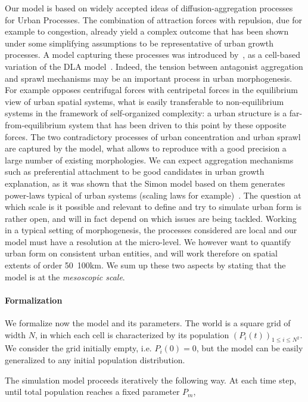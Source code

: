 \documentclass[10pt,letterpaper,draft]{article}
\begin{document}
Our model is based on widely accepted ideas of diffusion-aggregation processes for Urban Processes. The combination of attraction forces with repulsion, due for example to congestion, already yield a complex outcome that has been shown under some simplifying assumptions to be representative of urban growth processes. A model capturing these processes was introduced by~\cite{batty2006hierarchy}, as a cell-based variation of the DLA model~\cite{batty1991generating}. Indeed, the tension between antagonist aggregation and sprawl mechanisms may be an important process in urban morphogenesis. For example \cite{fujita1996economics} opposes centrifugal forces with centripetal forces in the equilibrium view of urban spatial systems, what is easily transferable to non-equilibrium systems in the framework of self-organized complexity: a urban structure is a far-from-equilibrium system that has been driven to this point by these opposite forces. The two contradictory processes of urban concentration and urban sprawl are captured by the model, what allows to reproduce with a good precision a large number of existing morphologies. We can expect aggregation mechanisms such as preferential attachment to be good candidates in urban growth explanation, as it was shown that the Simon model based on them generates power-laws typical of urban systems (scaling laws for example)~\cite{2016arXiv160806313S}. The question at which scale is it possible and relevant to define and try to simulate urban form is rather open, and will in fact depend on which issues are being tackled. Working in a typical setting of morphogenesis, the processes considered are local and our model must have a resolution at the micro-level. We however want to quantify urban form on consistent urban entities, and will work therefore on spatial extents of order 50~100km. We sum up these two aspects by stating that the model is at the \emph{mesoscopic scale}.


\paragraph*{Formalization}

We formalize now the model and its parameters. The world is a square grid of width $N$, in which each cell is characterized by its population $(P_i(t))_{1\leq i\leq N^2}$. We consider the grid initially empty, i.e. $P_i(0)=0$, but the model can be easily generalized to any initial population distribution.

The simulation model proceeds iteratively the following way.
At each time step, until total population reaches a fixed parameter $P_m$,
\end{document}
